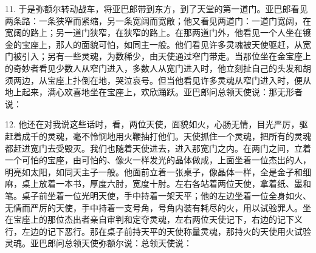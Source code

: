 11. 于是弥额尔转动战车，将亚巴郎带到东方，到了天堂的第一道门。亚巴郎看见两条路：一条狭窄而紧缩，另一条宽阔而宽敞；他又看见两道门：一道门宽阔，在宽阔的路上；另一道门狭窄，在狭窄的路上。在那两道门外，他看见一个人坐在镀金的宝座上，那人的面貌可怕，如同主一般。他们看见许多灵魂被天使驱赶，从宽门被引入；另有一些灵魂，为数稀少，由天使通过窄门带走。当那位坐在金宝座上的奇妙者看见少数人从窄门进入，多数人从宽门进入时，他立刻扯自己的头发和胡须两边，从宝座上扑倒在地，哭泣哀号。但当他看见许多灵魂从窄门进入时，便从地上起来，满心欢喜地坐在宝座上，欢欣踊跃。亚巴郎问总领天使说：那无形者说：\par

12. 他还在对我说这些话时，看，两位天使，面貌如火，心肠无情，目光严厉，驱赶着成千的灵魂，毫不怜悯地用火鞭抽打他们。天使抓住一个灵魂，把所有的灵魂都赶进宽门去受毁灭。我们也随着天使进去，进入那宽门之内。在两门之间，立着一个可怕的宝座，由可怕的、像火一样发光的晶体做成，上面坐着一位杰出的人，明亮如太阳，如同天主子一般。他面前立着一张桌子，像晶体一样，全是金子和细麻，桌上放着一本书，厚度六肘，宽度十肘。左右各站着两位天使，拿着纸、墨和笔。桌子前坐着一位光明天使，手中持着一架天平；他的左边坐着一位全身如火、无情而严厉的天使，手中持着一支号角，号角内装有耗尽的火，用以试验罪人。坐在宝座上的那位杰出者亲自审判和定夺灵魂，左右两位天使记下，右边的记下义行，左边的记下恶行。那在桌子前持天平的天使称量灵魂，那持火的天使用火试验灵魂。亚巴郎问总领天使弥额尔说：总领天使说：\par

